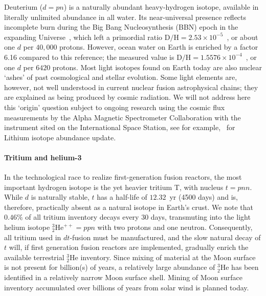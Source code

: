 \documentclass[particles,article,accept,pdftex,moreauthors]{Definitions/mdpi}
\begin{document}
Deuterium ($d=pn$) is a naturally abundant heavy-hydrogen isotope, available in literally unlimited abundance in all water. Its near-universal presence reflects incomplete burn during the Big Bang Nucleosynthesis (BBN) epoch in the expanding Universe~\cite{Rafelski:2023emw,Rafelski:2024fej}, which left a primordial ratio $\mathrm{D}/\mathrm{H}=2.53\times10^{-5}$~\cite{Cooke:2017cwo}, or about one $d$ per $40{,}000$ protons. However, ocean water on Earth is enriched by a factor 6.16 compared to this reference; the measured value is $\mathrm{D}/\mathrm{H}=1.5576\times10^{-4}$~\cite{Meija:2016}, or one $d$ per $6420$ protons. Most light isotopes found on Earth today are also nuclear `ashes' of past cosmological and stellar evolution. Some light elements are, however, not well understood in current nuclear fusion astrophysical chains; they are explained as being produced by cosmic radiation. We will not address here this `origin' question subject to ongoing research using the cosmic flux measurements by the Alpha Magnetic Spectrometer Collaboration with the instrument sited on the International Space Station, see for example,~\cite{AMS:2025xoq} for Lithium isotope abundance update.

\paragraph*{\bf Tritium and helium-3}
In the technological race to realize first-generation fusion reactors, the most important hydrogen isotope is the yet heavier tritium T, with nucleus $t=pnn$. While $d$ is naturally stable, $t$ has a half-life of $12.32$~yr (4500 days) and is, therefore, practically absent as a natural isotope in Earth's crust. We note that $0.46\%$ of all tritium inventory decays every 30 days, transmuting into the light helium isotope ${}^3_2\mathrm{He}^{++}=ppn$ with two protons and one neutron. Consequently, all tritium used in $dt$-fusion must be manufactured, and the slow natural decay of $t$ will, if first generation fusion reactors are implemented, gradually enrich the available terrestrial ${}^3_2$He inventory. Since mixing of material at the Moon surface is not present for billion(s) of years, a relatively large abundance of ${}^3_2$He has been identified in a relatively narrow Moon surface shell. Mining of Moon surface inventory accumulated over billions of years from solar wind is planned today.
\end{document}
